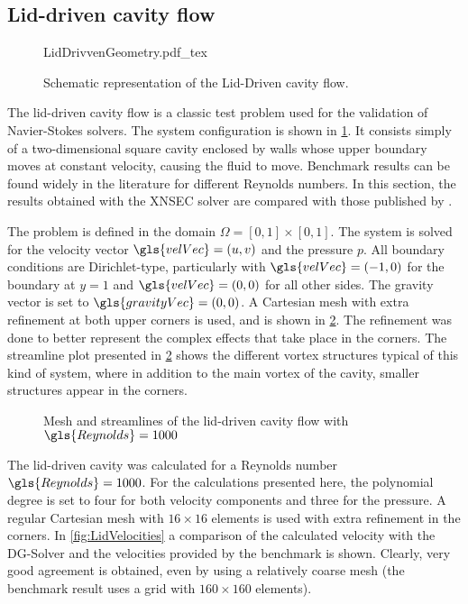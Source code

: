\subsection{Lid-driven cavity flow}

\begin{figure}[t]
	\begin{center}
		\def\svgwidth{0.3\textwidth}
		{LidDrivvenGeometry.pdf_tex}
		\caption{Schematic representation of the Lid-Driven cavity flow.}
		\label{fig:LidDrivenCavity}
	\end{center}
\end{figure}

The lid-driven cavity flow is a classic test problem used for the validation of Navier-Stokes solvers. The system configuration is shown in \cref{fig:LidDrivenCavity}. It consists simply of a two-dimensional square cavity enclosed by walls whose upper boundary moves at constant velocity, causing the fluid to move. Benchmark results can be found widely in the literature for different Reynolds numbers. In this section, the results obtained with the XNSEC solver are compared with those published by \textcite{botellaBenchmarkSpectralResults1998}. 

The problem is defined in the domain $\Omega = [0,1]\times [0,1]$. The system is solved for the velocity vector $\gls{velVec} = (u,v)$ and the pressure $p$. All boundary conditions are Dirichlet-type, particularly with $\gls{velVec} = (-1,0)$ for the boundary at $y = 1$ and $\gls{velVec} = (0,0)$ for all other sides. The gravity vector is set to $\gls{gravityVec} = (0,0)$.
A Cartesian mesh with extra refinement at both upper corners is used, and is shown in \cref{fig:LiddrivenMesh}. The refinement was done to better represent the complex effects that take place in the corners. The streamline plot presented in \cref{fig:LiddrivenMesh} shows the different vortex structures typical of this kind of system, where in addition to the main vortex of the cavity, smaller structures appear in the corners.

\begin{figure}[b]
	\centering
	\pgfplotsset{width=0.35 \textwidth, compat=1.3}
	\caption{Mesh and streamlines of the lid-driven cavity flow with $\gls{Reynolds} = 1000$} \label{fig:LiddrivenMesh}
\end{figure}

The lid-driven cavity was calculated for a Reynolds number $\gls{Reynolds} = 1000$. For the calculations presented here, the polynomial degree is set to four for both velocity components and three for the pressure. A regular Cartesian mesh with $16\times16$ elements is used with extra refinement in the corners. In \cref{fig:LidVelocities} a comparison of the calculated velocity with the DG-Solver and the velocities provided by the benchmark is shown. Clearly, very good agreement is obtained, even by using a relatively coarse mesh (the benchmark result uses a grid with $160\times160$ elements).

